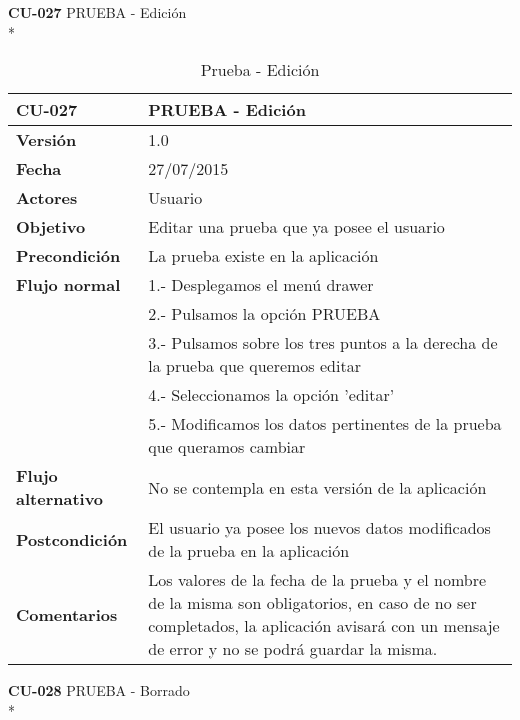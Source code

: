 \documentclass[../pfc.tex]{subfiles}
\begin{document}
	\textbf{CU-027}	PRUEBA - Edición\\*
	
	\begin{table}[H]
		\centering
		\begin{tabular}[t]{|p{3cm}|p{9.5cm}|}
			\hline \textbf{CU-027} & \textbf{PRUEBA - Edición} \\*
			\hline\hline \textbf{Versión} & 1.0 \\*
			\hline\hline \textbf{Fecha} & 27/07/2015 \\*
			\hline\textbf{Actores} 	& Usuario\\*
			\hline \textbf{Objetivo} & Editar una prueba que ya posee el usuario\\* 			
			\hline \textbf{Precondición} & La prueba existe en la aplicación\\* 
			\hline \textbf{Flujo normal} & 1.- Desplegamos el menú drawer \\* 
			& 2.- Pulsamos la opción PRUEBA\\*	
			& 3.- Pulsamos sobre los tres puntos a la derecha de la prueba que queremos editar\\*	
			& 4.- Seleccionamos la opción 'editar'\\*	
			& 5.- Modificamos los datos pertinentes de la prueba que queramos cambiar\\*	
			\hline \textbf{Flujo alternativo} & No se contempla en esta versión de la aplicación \\* 
			\hline \textbf{Postcondición} & El usuario ya posee los nuevos datos modificados de la prueba en la aplicación \\* 
			\hline \textbf{Comentarios}   & Los valores de la fecha de la prueba y el nombre de la misma son obligatorios, en caso de no ser completados, la aplicación avisará con un mensaje de error y no se podrá guardar la misma.\\*
			\hline
		\end{tabular}
		\caption{Prueba - Edición}
		\label{tabla:caso027}
	\end{table}
	
	\clearpage
	
	\textbf{CU-028}	PRUEBA - Borrado\\*
	
\end{document}
